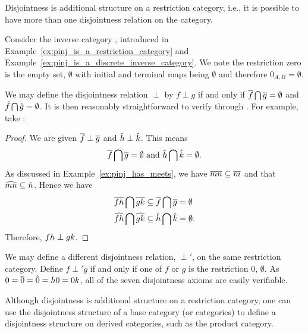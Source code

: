 Disjointness is additional structure on a restriction category, i.e., it is possible to have more
than one disjointness relation on the category.
\begin{example}\label{ex:pinj_has_a_disjointness_relation}
  Consider the inverse category \pinj, introduced in Example~\ref{ex:pinj_is_a_restriction_category}
  and Example~\ref{ex:pinj_is_a_discrete_inverse_category}.
  We note the restriction zero is the empty set, $\emptyset$ with initial and terminal maps being
  $\emptyset$ and therefore $0_{A,B} = \emptyset$.

  We may define the disjointness relation $\perp$ by $f \perp g$ if and only if
  $\overline{f}\bigcap\overline{g}=\emptyset$ and $\hat{f}\bigcap\hat{g} = \emptyset$. It is then
  reasonably straightforward to verify  through . For example, take
  :
  \begin{proof}
    We are given $\overline{f}\perp\overline{g}$ and $\hat{h}\perp\hat{k}$. This means
    \[
      \overline{f}\bigcap\overline{g}=\emptyset \text{ and }\hat{h}\bigcap\hat{k} = \emptyset.
    \]
    As discussed in Example~\ref{ex:pinj_has_meets}, we have
    $\overline{m n} \subseteq \overline{m}$ and that $\widehat{m n} \subseteq \hat{n}$. Hence we have
    \begin{align*}
      \overline{f h}\bigcap\overline{g k}&\subseteq \overline{f}\bigcap \overline{g}= \emptyset\\
      \widehat{f h}\bigcap\widehat{g k}&\subseteq \hat{h}\bigcap \hat{k}= \emptyset.
    \end{align*}
    Therefore, $f h \perp g k$.
  \end{proof}

  We may define a different disjointness relation, $\perp'$, on the same restriction category.
  Define $f \perp' g$ if and only if one of $f$ or $g$ is the restriction 0, $\emptyset$. As
  $0 = \overline{0} = \hat{0} = h 0 = 0 k$, all of the seven disjointness axioms are easily verifiable.
\end{example}

Although disjointness is additional structure on a restriction category, one can use the
disjointness structure of a base category (or categories) to define a disjointness structure
on derived categories, such as the product category.

